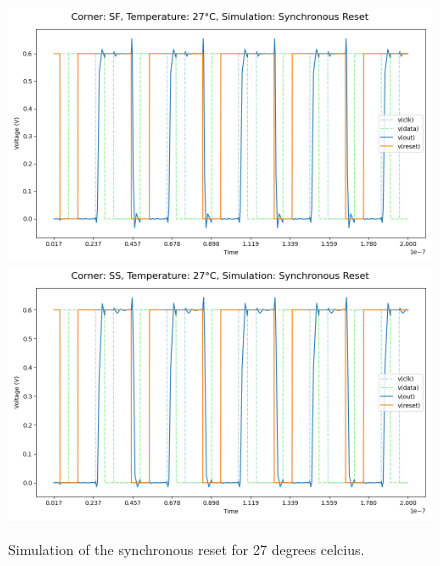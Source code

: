 \begin{figure}[H]
    \vspace{5pt}
    \includegraphics[height= 0.21\textheight]{figures/aimspice/SF/27/W4.csv.png}
    \vspace{5pt}
    \includegraphics[height= 0.21\textheight]{figures/aimspice/SS/27/W4.csv.png}
    \caption{Simulation of the synchronous reset for 27 degrees celcius.}
    \label{fig:aimspice_W4_27}
\end{figure}

\pagebreak

